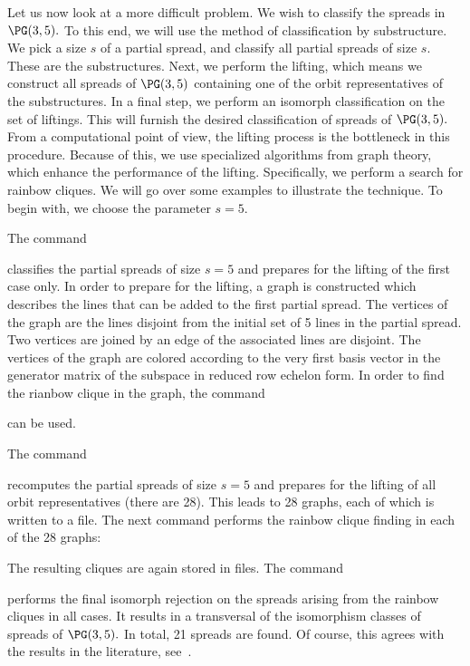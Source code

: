 Let us now look at a more difficult problem. 
We wish to classify the spreads in $\PG(3,5).$
To this end, we will use the method of classification by substructure. 
We pick a size $s$ of a partial spread, and classify all partial spreads of size $s$. 
These are the substructures. 
Next, we perform the lifting, which means we construct all spreads of $\PG(3,5)$ 
containing one of the orbit representatives of the substructures. 
In a final step, we perform an isomorph classification on the set of liftings. 
This will furnish the desired classification of spreads of $\PG(3,5).$
From a computational point of view, the lifting process is the bottleneck in this procedure. 
Because of this, we use specialized algorithms from graph theory, which enhance the performance of the lifting. 
Specifically, we perform a search for rainbow cliques. 
We will go over some examples to illustrate the technique. 
To begin with, we choose the parameter $s=5.$

\bigskip


The command 
{\tt

}
classifies the partial spreads of size $s=5$ and 
prepares for the lifting of the first case only. 
In order to prepare for the lifting, a graph is constructed which 
describes the lines that can be added to the first partial spread. 
The vertices of the graph are the lines disjoint from the initial set of 5 lines in the partial spread. Two vertices are joined by an edge of the associated lines are disjoint. 
The vertices of the graph are colored according to the very first basis vector in the 
generator matrix of the subspace in reduced row echelon form.
In order to find the rianbow clique in the graph, the command 
{\tt

}
can be used. 

\bigskip

The command 
{\tt

}
recomputes the partial spreads of size $s=5$ and prepares for the lifting of all 
orbit representatives (there are 28). This leads to 28 graphs, each of which is 
written to a file.
The next command performs the rainbow clique finding in each of the 28 graphs:
{\tt

}
The resulting cliques are again stored in files. 
The command 
{\tt

}
performs the final isomorph rejection on the spreads arising from the 
rainbow cliques in all cases. 
It results in a transversal of the isomorphism classes 
of spreads of $\PG(3,5).$ 
In total, 21 spreads are found. 
Of course, this agrees with the results in the literature, 
see~\cite{CzerwinskiOakden92}.






